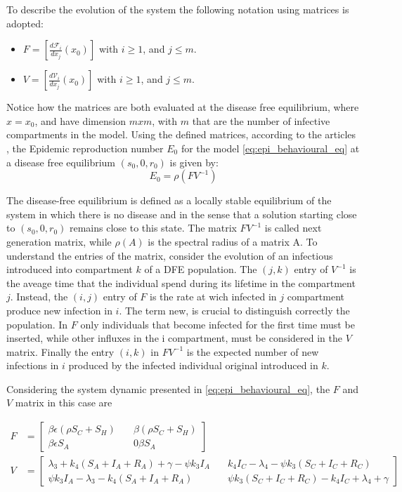To describe the evolution of the system the following notation using matrices is adopted: 
\begin{itemize}
	\item $F = [\frac{d \mathcal{F}_i}{d x_j}(x_0)]$ with $i \ge 1$, and $j \le m$.
	\item $V = [\frac{d \mathcal{V}_i}{d x_j}(x_0)]$ with $i \ge 1$, and $j \le m$.	
\end{itemize} 
Notice how the matrices are both evaluated at the disease free equilibrium, where $x = x_0$, and have dimension $m x m$, with $m$ that are the number of infective compartments in the model. 
Using the defined matrices, according to the articles \cite{van_den_Driessche_2002,van_den_Driessche_2017}, the Epidemic reproduction number $E_0$ for the model \eqref{eq:epi_behavioural_eq} at a disease free equilibrium $(s_0, 0, r_0)$ is given by:
\begin{equation}
E_0 = \rho(FV^{-1})
\label{eq:R_0_eqn}
\end{equation}

The disease-free equilibrium is defined as a locally stable equilibrium of the system in which there is no disease and in the sense that a solution starting close to $(s_0, 0, r_0)$ remains close to this state. 
The matrix $FV^{-1}$ is called next generation matrix, while $\rho(A)$ is the spectral radius of a matrix A. To understand the entries of the matrix, consider the evolution of an infectious introduced into compartment $k$ of a DFE population. The $(j,k)$ entry of $V^{-1}$ is the aveage time that the individual spend during its lifetime in the compartment $j$. Instead, the $(i,j)$ entry of $F$ is the  rate at wich infected in $j$ compartment produce new infection in $i$. The term new, is crucial to distinguish correctly the population. In $F$ only individuals that become infected for the first time must be inserted, while other influxes in the i compartment, must be considered in the $V$ matrix. Finally the entry $(i,k)$  in $FV^{-1}$ is the expected number of new infections in  $i$ produced by the infected individual original introduced in $k$.

Considering the system dynamic presented in \eqref{eq:epi_behavioural_eq}, the $F$ and $V$ matrix in this case are

\begin{align}
F & = 
\begin{bmatrix}
	\beta \epsilon(\rho S_C + S_H) \quad & \beta(\rho S_C + S_H) \\
	\beta \epsilon S_A \quad& 0\beta S_A
\end{bmatrix} \\
V & = 
\begin{bmatrix}
	\lambda_3+k_4(S_A+I_A+R_A)+\gamma-\psi k_3 I_A \quad & k_4 I_C-\lambda_4-\psi k_3 (S_C+I_C + R_C)  \\
	\psi k_3 I_A - \lambda_3 - k_4 (S_A + I_A + R_A) \quad & \psi k_3 (S_C + I_C + R_C) - k_4 I_C + \lambda_4 + \gamma
\end{bmatrix}
\label{eq:next_gen_matrices}
\end{align}

